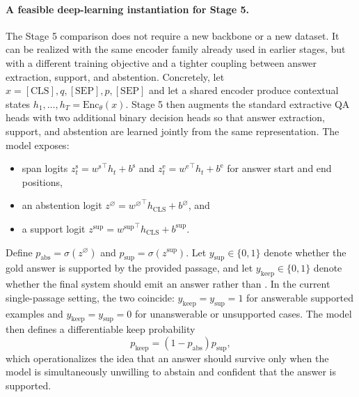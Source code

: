 \paragraph{A feasible deep-learning instantiation for Stage 5.}
The Stage 5 comparison does not require a new backbone or a new dataset.
It can be realized with the same encoder family already used in earlier
stages, but with a different training objective and a tighter coupling between
answer extraction, support, and abstention.
Concretely, let
\(x = [\mathrm{CLS}], q, [\mathrm{SEP}], p, [\mathrm{SEP}]\)
and let a shared encoder produce contextual states
\(h_1, \dots, h_T = \mathrm{Enc}_{\theta}(x)\).
Stage 5 then augments the standard extractive QA heads with two additional
binary decision heads so that answer extraction, support, and abstention are
learned jointly from the same representation.
The model exposes:
\begin{itemize}[leftmargin=1.25em]
  \item span logits
  \(z^{\mathrm{s}}_t = {w^{\mathrm{s}}}^\top h_t + b^{\mathrm{s}}\)
  and
  \(z^{\mathrm{e}}_t = {w^{\mathrm{e}}}^\top h_t + b^{\mathrm{e}}\)
  for answer start and end positions,
  \item an abstention logit
  \(z^{\varnothing} = {w^{\varnothing}}^\top h_{\mathrm{CLS}} + b^{\varnothing}\),
  and
  \item a support logit
  \(z^{\mathrm{sup}} = {w^{\mathrm{sup}}}^\top h_{\mathrm{CLS}} + b^{\mathrm{sup}}\).
\end{itemize}
Define
\(p_{\mathrm{abs}} = \sigma(z^{\varnothing})\)
and
\(p_{\mathrm{sup}} = \sigma(z^{\mathrm{sup}})\).
Let
\(y_{\mathrm{sup}} \in \{0,1\}\)
denote whether the gold answer is supported by the provided passage, and let
\(y_{\mathrm{keep}} \in \{0,1\}\)
denote whether the final system should emit an answer rather than
\abstain.
In the current single-passage setting, the two coincide:
\(y_{\mathrm{keep}} = y_{\mathrm{sup}} = 1\)
for answerable supported examples and
\(y_{\mathrm{keep}} = y_{\mathrm{sup}} = 0\)
for unanswerable or unsupported cases.
The model then defines a differentiable keep probability
\begin{equation}
  p_{\mathrm{keep}}
  =
  \left(1 - p_{\mathrm{abs}}\right) p_{\mathrm{sup}},
\end{equation}
which operationalizes the idea that an answer should survive only when the
model is simultaneously unwilling to abstain and confident that the answer is
supported.

